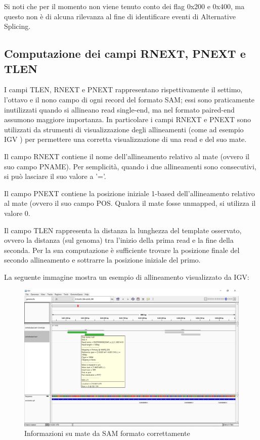 Si noti che per il momento non viene tenuto conto dei flag 0x200 e 0x400, ma questo non è di alcuna rilevanza al fine di identificare eventi di Alternative Splicing.

\newpage

\subsection{Computazione dei campi RNEXT, PNEXT e TLEN}
I campi TLEN, RNEXT e PNEXT rappresentano rispettivamente il settimo, l'ottavo e il nono campo di ogni record del formato SAM; essi sono praticamente inutilizzati quando si allineano read single-end, ma nel formato paired-end assumono maggiore importanza. In particolare i campi RNEXT e PNEXT sono utilizzati da strumenti di visualizzazione degli allineamenti (come ad esempio IGV \cite{IGV}) per permettere una corretta visualizzazione di una read e del suo mate.

Il campo RNEXT contiene il nome dell'allineamento relativo al mate (ovvero il suo campo PNAME). Per semplicità, quando i due allineamenti sono consecutivi, si può lasciare il suo valore a '='.

Il campo PNEXT contiene la posizione iniziale 1-based dell'allineamento relativo al mate (ovvero il suo campo POS. Qualora il mate fosse unmapped, si utilizza il valore 0.

Il campo TLEN rappresenta la distanza la lunghezza del template osservato, ovvero la distanza (sul genoma) tra l'inizio della prima read e la fine della seconda. Per la sua computazione è sufficiente trovare la posizione finale del secondo allineamento e sottrarre la posizione iniziale del primo.

La seguente immagine mostra un esempio di allineamento visualizzato da IGV:

\begin{figure}[h]
	\centering
	\includegraphics[width=\linewidth]{images/mateinfo.png}
  \caption{Informazioni su mate da SAM formato correttamente}
  \label{fig:MateInfo}
\end{figure}

